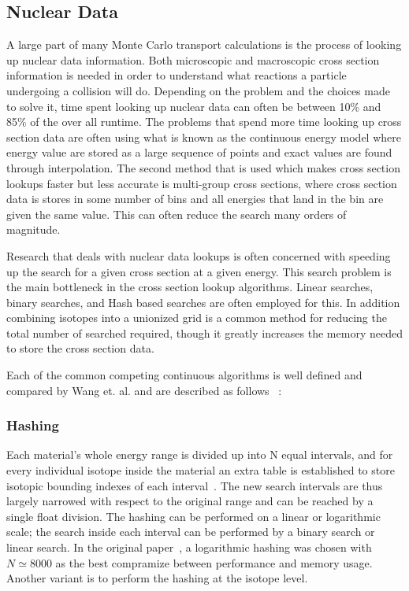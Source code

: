 \subsection{\textbf{Nuclear Data}}

A large part of many Monte Carlo transport calculations is the process of looking up nuclear data information.
%
Both microscopic and macroscopic cross section information is needed in order to understand what reactions a particle undergoing a collision will do.
%
Depending on the problem and the choices made to solve it, time spent looking up nuclear data can often be between 10\% and 85\% of the over all runtime.
%
The problems that spend more time looking up cross section data are often using what is known as the continuous energy model where energy value are stored as a large sequence of points and exact values are found through interpolation.
%
The second method that is used which makes cross section lookups faster but less accurate is multi-group cross sections, where cross section data is stores in some number of bins and all energies that land in the bin are given the same value.
%
This can often reduce the search many orders of magnitude.
%

%
Research that deals with nuclear data lookups is often concerned with speeding up the search for a given cross section at a given energy.
%
This search problem is the main bottleneck in the cross section lookup algorithms.
%
Linear searches, binary searches, and Hash based searches are often employed for this.
%
In addition combining isotopes into a unionized grid is a common method for reducing the total number of searched required, though it greatly increases the memory needed to store the cross section data.
%

Each of the common competing continuous algorithms is well defined and compared by Wang et. al. and are described as follows ~\cite{wang2016competing}:
%
\subsubsection*{ \textbf{Hashing} } Each material's whole energy range is divided up into N equal intervals, and for every individual isotope inside the material an extra table is established to store isotopic bounding indexes of each interval~\cite{brown2014new}. The new search intervals are thus largely narrowed with respect to the original range and can be reached by a single float division. The hashing can be performed on a linear or logarithmic scale; the search inside each interval can be performed by a binary search or linear search. In the original paper~\cite{brown2014new}, a logarithmic hashing was chosen with $ N \simeq 8000 $ as the best compramize between performance and memory usage. Another variant is to perform the hashing at the isotope level.
%
